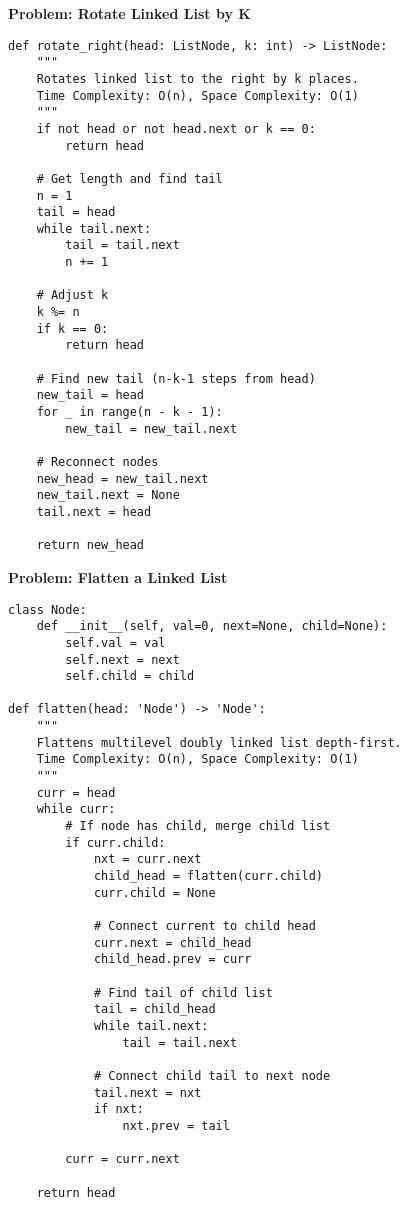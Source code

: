 \noindent\textbf{Problem: Rotate Linked List by K}
\begin{verbatim}
def rotate_right(head: ListNode, k: int) -> ListNode:
    """
    Rotates linked list to the right by k places.
    Time Complexity: O(n), Space Complexity: O(1)
    """
    if not head or not head.next or k == 0:
        return head
    
    # Get length and find tail
    n = 1
    tail = head
    while tail.next:
        tail = tail.next
        n += 1
    
    # Adjust k
    k %= n
    if k == 0:
        return head
    
    # Find new tail (n-k-1 steps from head)
    new_tail = head
    for _ in range(n - k - 1):
        new_tail = new_tail.next
    
    # Reconnect nodes
    new_head = new_tail.next
    new_tail.next = None
    tail.next = head
    
    return new_head
\end{verbatim}

\noindent\textbf{Problem: Flatten a Linked List}
\begin{verbatim}
class Node:
    def __init__(self, val=0, next=None, child=None):
        self.val = val
        self.next = next
        self.child = child

def flatten(head: 'Node') -> 'Node':
    """
    Flattens multilevel doubly linked list depth-first.
    Time Complexity: O(n), Space Complexity: O(1)
    """
    curr = head
    while curr:
        # If node has child, merge child list
        if curr.child:
            nxt = curr.next
            child_head = flatten(curr.child)
            curr.child = None
            
            # Connect current to child head
            curr.next = child_head
            child_head.prev = curr
            
            # Find tail of child list
            tail = child_head
            while tail.next:
                tail = tail.next
                
            # Connect child tail to next node
            tail.next = nxt
            if nxt:
                nxt.prev = tail
                
        curr = curr.next
        
    return head
\end{verbatim}

